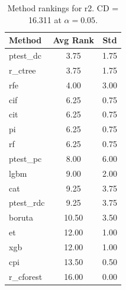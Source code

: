\begin{table}[h]
\centering
\caption{Method rankings for r2. CD = 16.311 at $\alpha=0.05$.}
\label{tab:ranks_r2}
\begin{tabular}{lcc}
\toprule
Method & Avg Rank & Std \\
\midrule
ptest_dc & 3.75 & 1.75 \\
r_ctree & 3.75 & 1.75 \\
rfe & 4.00 & 3.00 \\
cif & 6.25 & 0.75 \\
cit & 6.25 & 0.75 \\
pi & 6.25 & 0.75 \\
rf & 6.25 & 0.75 \\
ptest_pc & 8.00 & 6.00 \\
lgbm & 9.00 & 2.00 \\
cat & 9.25 & 3.75 \\
ptest_rdc & 9.25 & 3.75 \\
boruta & 10.50 & 3.50 \\
et & 12.00 & 1.00 \\
xgb & 12.00 & 1.00 \\
cpi & 13.50 & 0.50 \\
r_cforest & 16.00 & 0.00 \\
\bottomrule
\end{tabular}
\end{table}